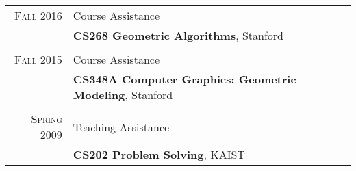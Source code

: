 \documentclass[letterpaper,10pt]{article} %
\newcommand{\blankline}{\quad\pagebreak[2]}
\begin{document}
{\begin{tabular}{r|p{11cm}}

\textsc{Fall 2016} & Course Assistance\\
& \textbf{CS268 Geometric Algorithms}, Stanford\\
& \\


\textsc{Fall 2015} & Course Assistance\\
& \textbf{CS348A Computer Graphics: Geometric Modeling}, Stanford\\
& \\


\textsc{Spring 2009} & Teaching Assistance\\
& \textbf{CS202 Problem Solving}, KAIST\\
\end{tabular}\\

\blankline



%
%

}
\end{document}
